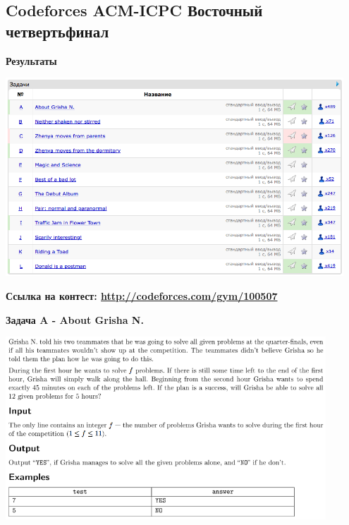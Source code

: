 \documentclass[a4paper,12pt]{article}
\begin{document}
%
%
\newpage
\subsection{Codeforces ACM-ICPC Восточный четвертьфинал}

\textbf{{\large Результаты}} \\
\begin{center}
\includegraphics[width=0.95\textwidth]{CT_ACM_EAST/CT_ACM_EAST_result.png}\\ [1cm]
\end{center}

\textbf{{\large Ссылка на контест: \url{http://codeforces.com/gym/100507}}}

\newpage
\textbf{{\large Задача A - About Grisha N.}}

\begin{center}
\includegraphics[width=0.9\textwidth]{CT_ACM_EAST/CT_ACM_EAST_A.png}\\ [1cm]
\end{center}
\end{document}
